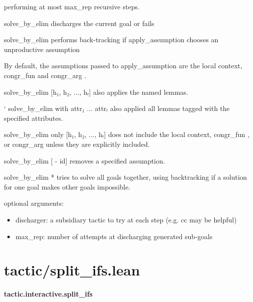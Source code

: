 \documentclass{article}
\begin{document}
performing at most 
\colorbox[RGB]{253,246,227}{{{{\color[RGB]{101, 123, 131} max\_rep }}}} recursive steps.
\par
\colorbox[RGB]{253,246,227}{{{{\color[RGB]{101, 123, 131} solve\_by\_elim }}}} discharges the current goal or fails
\par
\colorbox[RGB]{253,246,227}{{{{\color[RGB]{101, 123, 131} solve\_by\_elim }}}} performs back-tracking if 
\colorbox[RGB]{253,246,227}{{{{\color[RGB]{101, 123, 131} apply\_assumption }}}} chooses an unproductive assumption
\par
By default, the assumptions passed to apply\_assumption are the local context, 
\colorbox[RGB]{253,246,227}{{{{\color[RGB]{101, 123, 131} congr\_fun }}}} and
\colorbox[RGB]{253,246,227}{{{{\color[RGB]{101, 123, 131} congr\_arg }}}}.
\par
\colorbox[RGB]{253,246,227}{{{{\color[RGB]{101, 123, 131} solve\_by\_elim {[}h₁, h₂, ..., hᵣ{]} }}}} also applies the named lemmas.
\par
`
solve\_by\_elim with attr₁ ... attrᵣ also applied all lemmas tagged with the specified attributes.
\par
\colorbox[RGB]{253,246,227}{{{{\color[RGB]{101, 123, 131} solve\_by\_elim only {[}h₁, h₂, ..., hᵣ{]} }}}} does not include the local context, 
\colorbox[RGB]{253,246,227}{{{{\color[RGB]{101, 123, 131} congr\_fun }}}}, or 
\colorbox[RGB]{253,246,227}{{{{\color[RGB]{101, 123, 131} congr\_arg }}}}unless they are explicitly included.
\par
\colorbox[RGB]{253,246,227}{{{{\color[RGB]{101, 123, 131} solve\_by\_elim {[} }}}{{{\color[RGB]{181, 137, 0} - }}}{{{\color[RGB]{101, 123, 131} id{]} }}}} removes a specified assumption.
\par
\colorbox[RGB]{253,246,227}{{{{\color[RGB]{101, 123, 131} solve\_by\_elim }}}{{{\color[RGB]{181, 137, 0} * }}}} tries to solve all goals together, using backtracking if a solution for one goal
makes other goals impossible.
\par
optional arguments:
\begin{itemize}\item discharger: a subsidiary tactic to try at each step (e.g. 
\colorbox[RGB]{253,246,227}{{{{\color[RGB]{101, 123, 131} cc }}}} may be helpful)

\item max\_rep: number of attempts at discharging generated sub-goals

\end{itemize}\section{tactic/split\_ifs.lean}\paragraph{tactic.interactive.split\_ifs}
\end{document}
